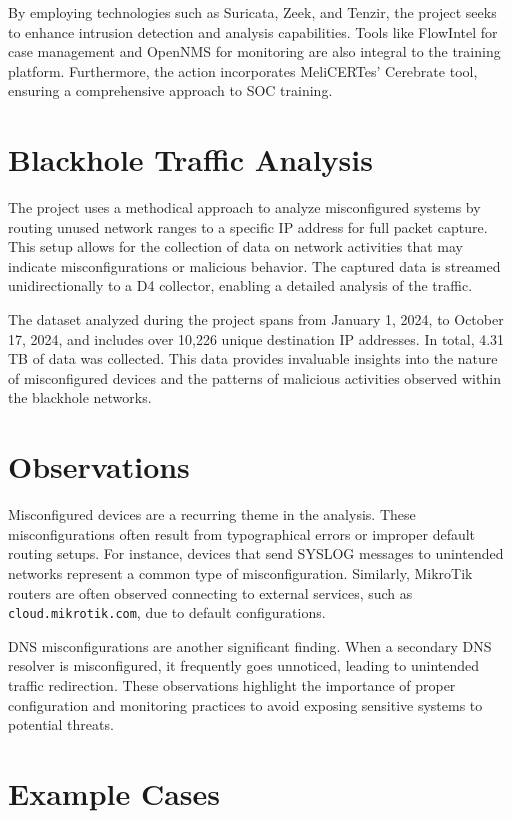 \documentclass[10pt,a4paper]{report}
\begin{document}
By employing technologies such as Suricata, Zeek, and Tenzir, the project seeks to enhance intrusion detection and analysis capabilities. Tools like FlowIntel for case management and OpenNMS for monitoring are also integral to the training platform. Furthermore, the action incorporates MeliCERTes' Cerebrate tool, ensuring a comprehensive approach to SOC training.

\chapter{Blackhole Traffic Analysis}
The project uses a methodical approach to analyze misconfigured systems by routing unused network ranges to a specific IP address for full packet capture. This setup allows for the collection of data on network activities that may indicate misconfigurations or malicious behavior. The captured data is streamed unidirectionally to a D4 collector, enabling a detailed analysis of the traffic.

The dataset analyzed during the project spans from January 1, 2024, to October 17, 2024, and includes over 10,226 unique destination IP addresses. In total, 4.31 TB of data was collected. This data provides invaluable insights into the nature of misconfigured devices and the patterns of malicious activities observed within the blackhole networks.

\chapter{Observations}
Misconfigured devices are a recurring theme in the analysis. These misconfigurations often result from typographical errors or improper default routing setups. For instance, devices that send SYSLOG messages to unintended networks represent a common type of misconfiguration. Similarly, MikroTik routers are often observed connecting to external services, such as \texttt{cloud.mikrotik.com}, due to default configurations.

DNS misconfigurations are another significant finding. When a secondary DNS resolver is misconfigured, it frequently goes unnoticed, leading to unintended traffic redirection. These observations highlight the importance of proper configuration and monitoring practices to avoid exposing sensitive systems to potential threats.

\chapter{Example Cases}
\end{document}
